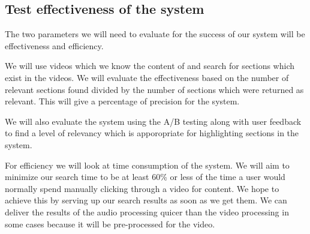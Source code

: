 \documentclass[a4paper,12pt]{article}
\begin{document}
\subsection{Test effectiveness of the system}
The two parameters we will need to evaluate for the success of our system will be effectiveness and efficiency.

We will use videos which we know the content of and search for sections which exist in the videos. We will evaluate the effectiveness based on the number of relevant sections found divided by the number of sections which were returned as relevant. This will give a percentage of precision for the system.

We will also evaluate the system using the A/B testing along with user feedback to find a level of relevancy which is apporopriate for highlighting sections in the system.

For efficiency we will look at time consumption of the system. We will aim to minimize our search time to be at least 60\% or less of the time a user would normally spend manually clicking through a video for content. We hope to achieve this by serving up our search results as soon as we get them. We can deliver the results of the audio processing quicer than the video processing in some cases because it will be pre-processed for the video.

\newpage
\theendnotes
\end{document}
